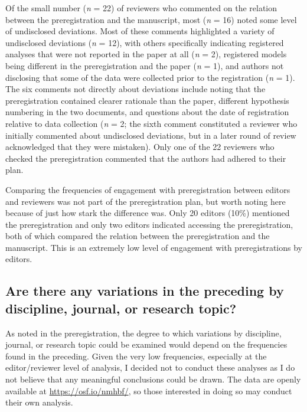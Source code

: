 \documentclass[authordate, meta]{jote-new-article}
\begin{document}
	Of the small number (\emph{n} = 22) of reviewers who commented on the relation between the preregistration and the manuscript, most (\emph{n} = 16) noted some level of undisclosed deviations. Most of these comments highlighted a variety of undisclosed deviations (\emph{n} = 12), with others specifically indicating registered analyses that were not reported in the paper at all (\emph{n} = 2), registered models being different in the preregistration and the paper (\emph{n} = 1), and authors not disclosing that some of the data were collected prior to the registration (\emph{n} = 1). The six comments not directly about deviations include noting that the preregistration contained clearer rationale than the paper, different hypothesis numbering in the two documents, and questions about the date of registration relative to data collection (\emph{n} = 2; the sixth comment constituted a reviewer who initially commented about undisclosed deviations, but in a later round of review acknowledged that they were mistaken). Only one of the 22 reviewers who checked the preregistration commented that the authors had adhered to their plan.



	Comparing the frequencies of engagement with preregistration between editors and reviewers was not part of the preregistration plan, but worth noting here because of just how stark the difference was. Only 20 editors (10\%) mentioned the preregistration and only two editors indicated accessing the preregistration, both of which compared the relation between the preregistration and the manuscript. This is an extremely low level of engagement with preregistrations by editors.



	\subsection{Are there any variations in the preceding by discipline, journal, or research topic?}



	As noted in the preregistration, the degree to which variations by discipline, journal, or research topic could be examined would depend on the frequencies found in the preceding. Given the very low frequencies, especially at the editor/reviewer level of analysis, I decided not to conduct these analyses as I do not believe that any meaningful conclusions could be drawn. The data are openly available at \url{https://osf.io/nmhbf/}, so those interested in doing so may conduct their own analysis.
\end{document}
